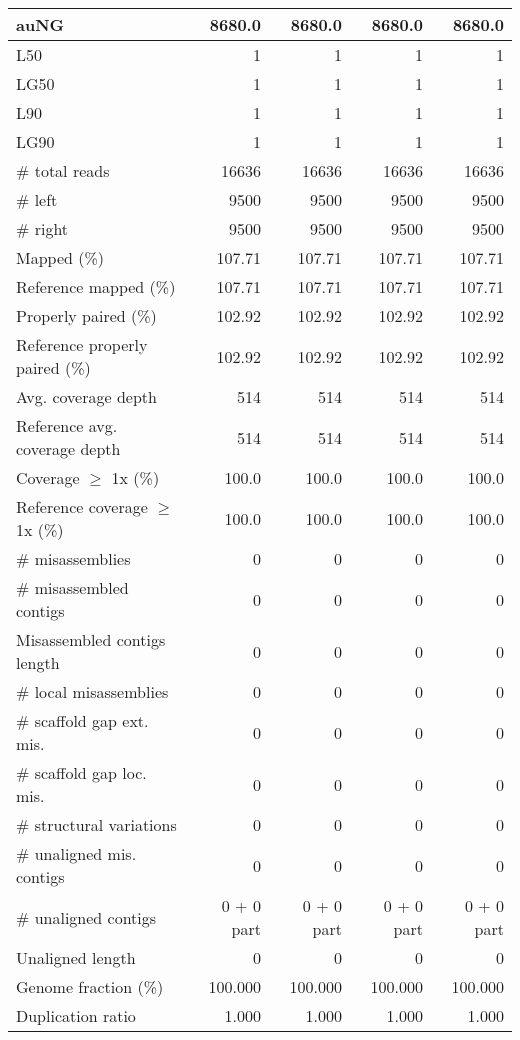 \documentclass[12pt,a4paper]{article}
\begin{document}
\begin{table}[ht]
\begin{center}
\begin{tabular}{|l*{4}{|r}|}
auNG & 8680.0 & 8680.0 & 8680.0 & 8680.0 \\ \hline
L50 & 1 & 1 & 1 & 1 \\ \hline
LG50 & 1 & 1 & 1 & 1 \\ \hline
L90 & 1 & 1 & 1 & 1 \\ \hline
LG90 & 1 & 1 & 1 & 1 \\ \hline
\# total reads & 16636 & 16636 & 16636 & 16636 \\ \hline
\# left & 9500 & 9500 & 9500 & 9500 \\ \hline
\# right & 9500 & 9500 & 9500 & 9500 \\ \hline
Mapped (\%) & 107.71 & 107.71 & 107.71 & 107.71 \\ \hline
Reference mapped (\%) & 107.71 & 107.71 & 107.71 & 107.71 \\ \hline
Properly paired (\%) & 102.92 & 102.92 & 102.92 & 102.92 \\ \hline
Reference properly paired (\%) & 102.92 & 102.92 & 102.92 & 102.92 \\ \hline
Avg. coverage depth & 514 & 514 & 514 & 514 \\ \hline
Reference avg. coverage depth & 514 & 514 & 514 & 514 \\ \hline
Coverage $\geq$ 1x (\%) & 100.0 & 100.0 & 100.0 & 100.0 \\ \hline
Reference coverage $\geq$ 1x (\%) & 100.0 & 100.0 & 100.0 & 100.0 \\ \hline
\# misassemblies & 0 & 0 & 0 & 0 \\ \hline
\# misassembled contigs & 0 & 0 & 0 & 0 \\ \hline
Misassembled contigs length & 0 & 0 & 0 & 0 \\ \hline
\# local misassemblies & 0 & 0 & 0 & 0 \\ \hline
\# scaffold gap ext. mis. & 0 & 0 & 0 & 0 \\ \hline
\# scaffold gap loc. mis. & 0 & 0 & 0 & 0 \\ \hline
\# structural variations & 0 & 0 & 0 & 0 \\ \hline
\# unaligned mis. contigs & 0 & 0 & 0 & 0 \\ \hline
\# unaligned contigs & 0 + 0 part & 0 + 0 part & 0 + 0 part & 0 + 0 part \\ \hline
Unaligned length & 0 & 0 & 0 & 0 \\ \hline
Genome fraction (\%) & 100.000 & 100.000 & 100.000 & 100.000 \\ \hline
Duplication ratio & 1.000 & 1.000 & 1.000 & 1.000 \\ \hline

\end{tabular}
\end{center}
\end{table}
\end{document}
